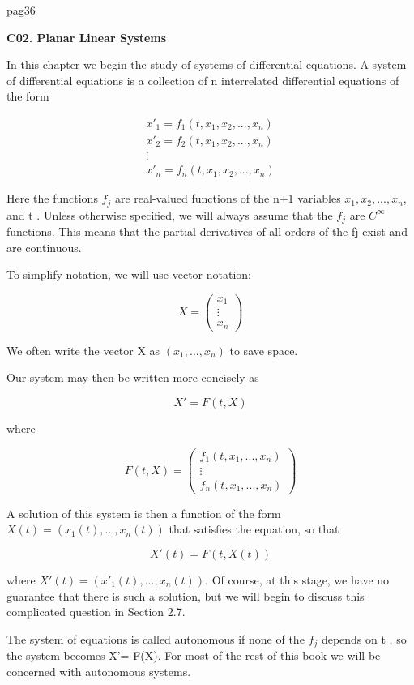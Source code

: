 \documentclass{article}
\begin{document}
pag36

\hfill

\textbf{C02. Planar Linear Systems}

\hfill

In this chapter we begin the study of systems of differential equations. A system
of differential equations is a collection of n interrelated differential equations
of the form

\[
\begin{matrix}
 x'_1= f_1(t, x_1, x_2, ...,x_n) \\
x'_2= f_2(t, x_1, x_2, ...,x_n) \\
\vdots  \\
x'_n= f_n(t, x_1, x_2, ...,x_n)
\end{matrix}
\]

Here the functions $f_j$ are real-valued functions of the n+1 variables $x_1, x_2, ..., x_n$, and t . Unless otherwise specified, we will always assume that the $f_j$ are $C^{\infty}$
functions. This means that the partial derivatives of all orders of the fj exist
and are continuous.

To simplify notation, we will use vector notation:


\[
X = \begin{pmatrix}
x_1 \\
\vdots \\
x_n
\end{pmatrix} 
\]

We often write the vector X as $(x_1, ..., x_n)$ to save space.

Our system may then be written more concisely as

\[
X' = F(t, X)
\]

where

\[
F(t,X) = \begin{pmatrix}
f_1(t, x_1, ..., x_n) \\
\vdots \\
f_n(t, x_1, ..., x_n)
\end{pmatrix} 
\]

A solution of this system is then a function of the form $X(t) =
(x_1(t ), ..., x_n(t))$ that satisfies the equation, so that

\[
X'(t) = F(t, X(t))
\]

where $X'(t) = (x'_1(t), ..., x_n(t))$. Of course, at this stage, we have no guarantee
that there is such a solution, but we will begin to discuss this complicated
question in Section 2.7.

The system of equations is called autonomous if none of the $f_j$ depends on
t , so the system becomes X'= F(X). For most of the rest of this book we will
be concerned with autonomous systems.
\end{document}
